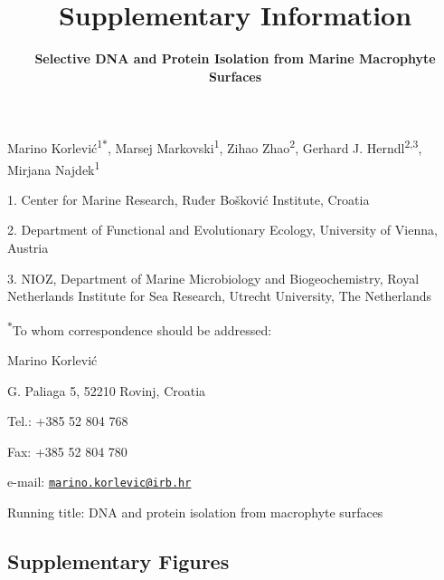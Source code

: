\documentclass[
  12pt,
]{article}
\title{\textbf{Supplementary Information}}
\subtitle{\textbf{Selective DNA and Protein Isolation from Marine Macrophyte
Surfaces}}
\author{}
\date{\vspace{-2.5em}}
\begin{document}
\maketitle

\vspace{20mm}

Marino Korlević\textsuperscript{1\(*\)}, Marsej
Markovski\textsuperscript{1}, Zihao Zhao\textsuperscript{2}, Gerhard J.
Herndl\textsuperscript{2,3}, Mirjana Najdek\textsuperscript{1}

1. Center for Marine Research, Ruđer Bošković Institute, Croatia

2. Department of Functional and Evolutionary Ecology, University of
Vienna, Austria

3. NIOZ, Department of Marine Microbiology and Biogeochemistry, Royal
Netherlands Institute for Sea Research, Utrecht University, The
Netherlands

\textsuperscript{\(*\)}To whom correspondence should be addressed:

Marino Korlević

G. Paliaga 5, 52210 Rovinj, Croatia

Tel.: +385 52 804 768

Fax: +385 52 804 780

e-mail:
\href{mailto:marino.korlevic@irb.hr}{\nolinkurl{marino.korlevic@irb.hr}}

Running title: DNA and protein isolation from macrophyte surfaces

\linenumbers
{}
\setlength\parindent{24pt}

\hypertarget{supplementary-figures}{%
\subsection{Supplementary Figures}\label{supplementary-figures}}
\end{document}
